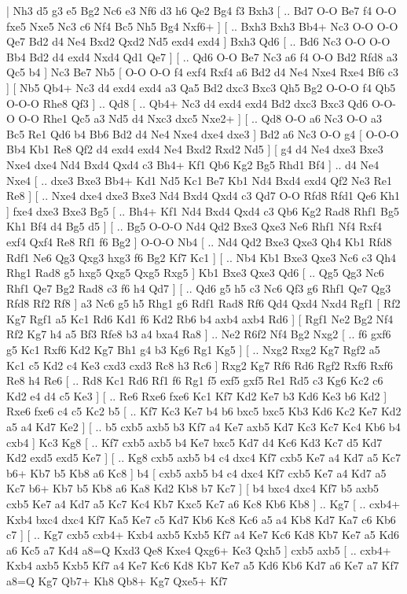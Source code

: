 \makegametitle 
|   Nh3   d5    g3   e5    Bg2   Nc6    e3   Nf6    d3   h6    Qe2   Bg4    f3   Bxh3 [ .. Bd7  O-O Be7  f4 O-O  fxe5 Nxe5  Nc3 c6  Nf4 Bc5  Nh5 Bg4  Nxf6+   ]  [ .. Bxh3  Bxh3 Bb4+  Nc3 O-O  O-O Qe7  Bd2 d4  Ne4 Bxd2  Qxd2 Nd5  exd4 exd4   ]  Bxh3   Qd6 [ .. Bd6  Nc3 O-O  O-O Bb4  Bd2 d4  exd4 Nxd4  Qd1 Qe7   ]  [ .. Qd6  O-O Be7  Nc3 a6  f4 O-O  Bd2 Rfd8  a3 Qc5  b4   ]  Nc3   Be7    Nb5 [  O-O O-O  f4 exf4  Rxf4 a6  Bd2 d4  Ne4 Nxe4  Rxe4 Bf6  c3   ]  [  Nb5 Qb4+  Nc3 d4  exd4 exd4  a3 Qa5  Bd2 dxc3  Bxc3 Qh5  Bg2 O-O-O  f4 Qb5  O-O-O Rhe8  Qf3   ] .. Qd8 [ .. Qb4+  Nc3 d4  exd4 exd4  Bd2 dxc3  Bxc3 Qd6  O-O-O O-O  Rhe1 Qc5  a3 Nd5  d4 Nxc3  dxc5 Nxe2+   ]  [ .. Qd8  O-O a6  Nc3 O-O  a3 Bc5  Re1 Qd6  b4 Bb6  Bd2 d4  Ne4 Nxe4  dxe4 dxe3   ]  Bd2   a6    Nc3   O-O    g4 [  O-O-O Bb4  Kb1 Re8  Qf2 d4  exd4 exd4  Ne4 Bxd2  Rxd2 Nd5   ]  [  g4 d4  Ne4 dxe3  Bxe3 Nxe4  dxe4 Nd4  Bxd4 Qxd4  c3 Bh4+  Kf1 Qb6  Kg2 Bg5  Rhd1 Bf4   ] .. d4    Ne4   Nxe4 [ .. dxe3  Bxe3 Bb4+  Kd1 Nd5  Kc1 Be7  Kb1 Nd4  Bxd4 exd4  Qf2 Ne3  Re1 Re8   ]  [ .. Nxe4  dxe4 dxe3  Bxe3 Nd4  Bxd4 Qxd4  c3 Qd7  O-O Rfd8  Rfd1 Qe6  Kh1   ]  fxe4   dxe3    Bxe3   Bg5 [ .. Bh4+  Kf1 Nd4  Bxd4 Qxd4  c3 Qb6  Kg2 Rad8  Rhf1 Bg5  Kh1 Bf4  d4 Bg5  d5   ]  [ .. Bg5  O-O-O Nd4  Qd2 Bxe3  Qxe3 Ne6  Rhf1 Nf4  Rxf4 exf4  Qxf4 Re8  Rf1 f6  Bg2   ]  O-O-O   Nb4 [ .. Nd4  Qd2 Bxe3  Qxe3 Qh4  Kb1 Rfd8  Rdf1 Ne6  Qg3 Qxg3  hxg3 f6  Bg2 Kf7  Kc1   ]  [ .. Nb4  Kb1 Bxe3  Qxe3 Nc6  c3 Qh4  Rhg1 Rad8  g5 hxg5  Qxg5 Qxg5  Rxg5   ]  Kb1   Bxe3    Qxe3   Qd6 [ .. Qg5  Qg3 Nc6  Rhf1 Qe7  Bg2 Rad8  c3 f6  h4 Qd7   ]  [ .. Qd6  g5 h5  c3 Nc6  Qf3 g6  Rhf1 Qe7  Qg3 Rfd8  Rf2 Rf8   ]  a3   Nc6    g5   h5    Rhg1   g6    Rdf1   Rad8    Rf6   Qd4    Qxd4   Nxd4    Rgf1 [  Rf2 Kg7  Rgf1 a5  Kc1 Rd6  Kd1 f6  Kd2 Rb6  b4 axb4  axb4 Rd6   ]  [  Rgf1 Ne2  Bg2 Nf4  Rf2 Kg7  h4 a5  Bf3 Rfe8  b3 a4  bxa4 Ra8   ] .. Ne2    R6f2   Nf4    Bg2   Nxg2 [ .. f6  gxf6 g5  Kc1 Rxf6  Kd2 Kg7  Bh1 g4  b3 Kg6  Rg1 Kg5   ]  [ .. Nxg2  Rxg2 Kg7  Rgf2 a5  Kc1 c5  Kd2 c4  Ke3 cxd3  cxd3 Rc8  h3 Rc6   ]  Rxg2   Kg7    Rf6   Rd6    Rgf2   Rxf6    Rxf6   Re8    h4   Re6 [ .. Rd8  Kc1 Rd6  Rf1 f6  Rg1 f5  exf5 gxf5  Re1 Rd5  c3 Kg6  Kc2 c6  Kd2 e4  d4 c5  Ke3   ]  [ .. Re6  Rxe6 fxe6  Kc1 Kf7  Kd2 Ke7  b3 Kd6  Ke3 b6  Kd2   ]  Rxe6   fxe6    c4   c5    Kc2   b5 [ .. Kf7  Kc3 Ke7  b4 b6  bxc5 bxc5  Kb3 Kd6  Kc2 Ke7  Kd2 a5  a4 Kd7  Ke2   ]  [ .. b5  cxb5 axb5  b3 Kf7  a4 Ke7  axb5 Kd7  Kc3 Kc7  Kc4 Kb6  b4 cxb4   ]  Kc3   Kg8 [ .. Kf7  cxb5 axb5  b4 Ke7  bxc5 Kd7  d4 Kc6  Kd3 Kc7  d5 Kd7  Kd2 exd5  exd5 Ke7   ]  [ .. Kg8  cxb5 axb5  b4 c4  dxc4 Kf7  cxb5 Ke7  a4 Kd7  a5 Kc7  b6+ Kb7  b5 Kb8  a6 Kc8   ]  b4 [  cxb5 axb5  b4 c4  dxc4 Kf7  cxb5 Ke7  a4 Kd7  a5 Kc7  b6+ Kb7  b5 Kb8  a6 Ka8  Kd2 Kb8  b7 Kc7   ]  [  b4 bxc4  dxc4 Kf7  b5 axb5  cxb5 Ke7  a4 Kd7  a5 Kc7  Kc4 Kb7  Kxc5 Kc7  a6 Kc8  Kb6 Kb8   ] .. Kg7 [ .. cxb4+  Kxb4 bxc4  dxc4 Kf7  Ka5 Ke7  c5 Kd7  Kb6 Kc8  Kc6 a5  a4 Kb8  Kd7 Ka7  c6 Kb6  c7   ]  [ .. Kg7  cxb5 cxb4+  Kxb4 axb5  Kxb5 Kf7  a4 Ke7  Kc6 Kd8  Kb7 Ke7  a5 Kd6  a6 Kc5  a7 Kd4  a8=Q Kxd3  Qe8 Kxe4  Qxg6+ Ke3  Qxh5   ]  cxb5   axb5    [ .. cxb4+  Kxb4 axb5  Kxb5 Kf7  a4 Ke7  Kc6 Kd8  Kb7 Ke7  a5 Kd6  Kb6 Kd7  a6 Ke7  a7 Kf7  a8=Q Kg7  Qb7+ Kh8  Qb8+ Kg7  Qxe5+ Kf7  